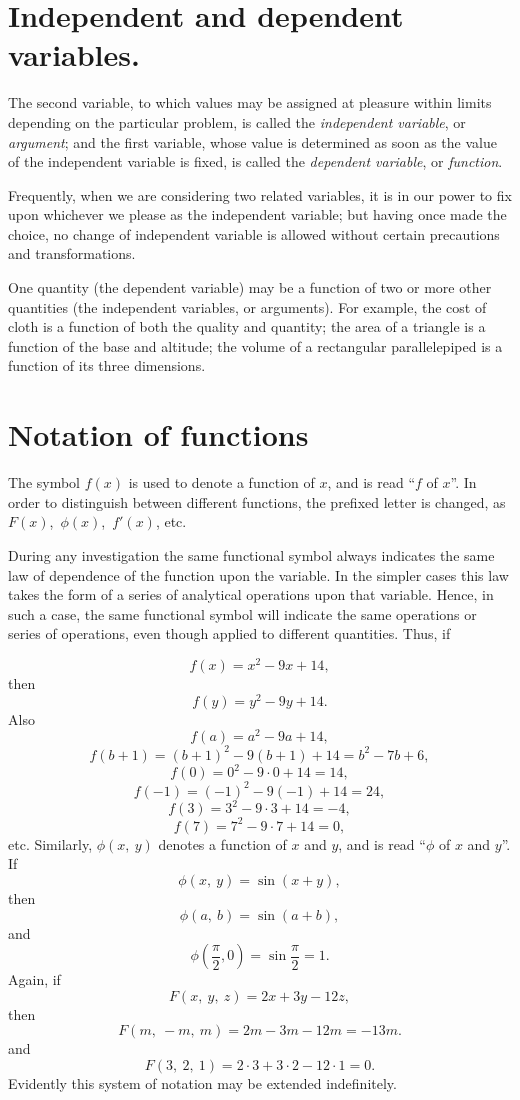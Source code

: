 \section{Independent and dependent variables.} The second variable, 
to which values may be assigned at pleasure within limits 
depending on the particular problem, is called the {\it independent 
variable}, or {\it argument}; and the first variable, whose value is 
determined as soon as the value of the independent variable is 
fixed, is called the {\it dependent variable}, or {\it function}.

Frequently, when we are considering two related variables, it is 
in our power to fix upon whichever we please as the independent 
variable; but having once made the choice, no change of 
independent variable is allowed without certain precautions and 
transformations.

One quantity (the dependent variable) may be a function of two 
or more other quantities (the independent variables, or arguments). 
For example, the cost of cloth is a function of both the 
quality and quantity; the area of a triangle is a function of 
the base and altitude; the volume of a rectangular parallelepiped 
is a function of its three dimensions.

\section{Notation of functions}

The symbol $f(x)$ is used to denote a function of $x$, and is 
read ``$f$ of $x$''. In order to distinguish between different 
functions, the prefixed letter is changed, as $F(x)$,\ $\phi(x)$,\ $f'(x)$, 
etc.

During any investigation the same functional symbol always 
indicates the same law of dependence of the function upon the variable. 
In the simpler cases this law takes the form of a series of 
analytical operations upon that variable. Hence, in such a case, 
the same functional symbol will indicate the same operations 
or series of operations, even though applied to different 
quantities. Thus, if

\[
f(x) = x^2 - 9x + 14,
\]
then 	
\[
f(y) 	= y^2 - 9y + 14.
\]
Also 	
\[f(a) 	= a^2 - 9a + 14,
\]
\[
f(b + 1) = (b + 1)^2 - 9(b + 1) + 14 = b^2 - 7b + 6,
\]
\[
f(0) 	= 0^2 - 9 \cdot 0 + 14 = 14,
\]
\[
f(-1) 	= (-1)^2 -9(-1) + 14 = 24,
\]
\[
f(3) 	= 3^2 -9 \cdot 3 + 14 = -4,
\]
\[
f(7) 	= 7^2 -9 \cdot 7 + 14 = 0,
\]
etc.
Similarly, $\phi(x,\ y)$ denotes a function of $x$ and $y$, 
and is read ``$\phi$ of $x$ and $y$''.
If 	
\[
\phi(x,\ y) 	= \sin(x + y),
\]
then 	
\[
\phi(a,\ b) 	= \sin(a + b),
\]
and 	
\[
\phi \left ( \frac{\pi}{2}, 0 \right )	= \sin \frac{\pi}{2} = 1.
\]
Again, if 	
\[
F( x,\ y,\ z ) 	= 2x + 3y - 12z,
\]
then 	
\[
F(m,\ -m,\ m) 	= 2m - 3m - 12m = - 13m.
\]
and 	
\[
F(3,\ 2,\ 1) 	= 2 \cdot 3 + 3 \cdot 2 - 12 \cdot 1 = 0.
\]
Evidently this system of notation may be extended indefinitely.

